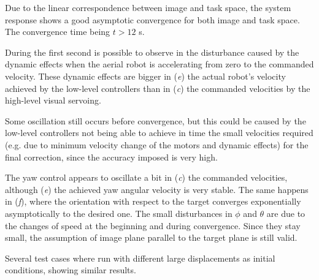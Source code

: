 %

Due to the linear correspondence between image and task space, the system response shows a good asymptotic convergence for both image and task space. The convergence time being $t > 12$ s.

During the first second is possible to observe in the disturbance caused by the dynamic effects when the aerial robot is accelerating from zero to the commanded velocity. These dynamic effects are bigger in (\emph{e}) the actual robot's velocity achieved by the low-level controllers than in (\emph{c}) the commanded velocities by the high-level visual servoing.

Some oscillation still occurs before convergence, but this could be caused by the low-level controllers not being able to achieve in time the small velocities required (e.g. due to minimum velocity change of the motors and dynamic effects) for the final correction, since the accuracy imposed is very high.

The yaw control appears to oscillate a bit in (\emph{c}) the commanded velocities, although (\emph{e}) the achieved yaw angular velocity is very stable. The same happens in (\emph{f}), where the orientation with respect to the target converges exponentially asymptotically to the desired one. The small disturbances in $\phi$ and $\theta$ are due to the changes of speed at the beginning and during convergence. Since they stay small, the assumption of image plane parallel to the target plane is still valid.

Several test cases where run with different large displacements as initial conditions, showing similar results. 


